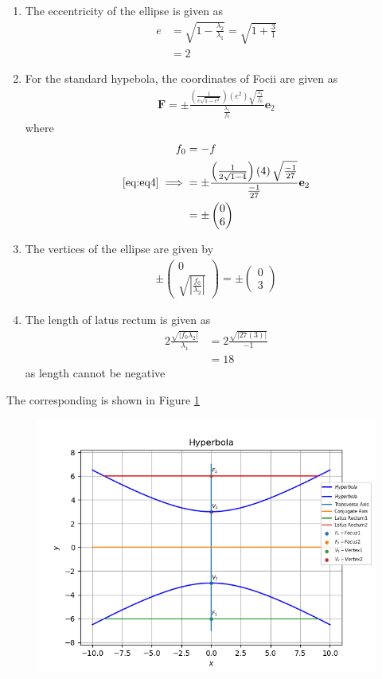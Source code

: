 \documentclass[12pt]{article}
\providecommand{\brak}[1]{\ensuremath{\left(#1\right)}}
\providecommand{\abs}[1]{\left\vert#1\right\vert}
\newcommand{\myvec}[1]{\ensuremath{\begin{pmatrix}#1\end{pmatrix}}}
\let\vec\mathbf
\begin{document}
\begin{enumerate}
\item The eccentricity of the ellipse is given as
\begin{align}
	e &= \sqrt{1 - \frac{\lambda_2}{\lambda_1}} = \sqrt{1+\frac{3}{1}}\\
	  &= 2
\end{align}
\item For the standard hypebola, the coordinates of Focii are given as
\begin{align}
	\label{eq:eq4}
	\vec{F} = \pm \frac{\brak{\frac{1}{e\sqrt{1-e^2}}}\brak{e^2}\sqrt{\frac{\lambda_1}{f_0}}}{\frac{\lambda_1}{f_0}} \vec{e}_2
\end{align}
where
\begin{align}
	f_0 &= -f\\
	\eqref{eq:eq4} \implies &= \pm \frac{\brak{\frac{1}{2\sqrt{1-4}}}\brak{4}\sqrt{\frac{-1}{27}}}{\frac{-1}{27}} \vec{e}_2\\
	&= \pm \myvec{0\\6}
\end{align}
\item The vertices of the ellipse are given by
\begin{align}
	\pm \myvec{0\\\sqrt{\abs{\frac{f_0}{\lambda_2}}}}= \pm \myvec{0\\3}
\end{align}
\item The length of latus rectum is given as
\begin{align}
	2\frac{\sqrt{\abs{f_0 \lambda_2}}}{\lambda_1} &= 2\frac{\sqrt{\abs{27\brak{3}}}}{-1}\\
	&= 18
\end{align}
as length cannot be negative
\end{enumerate}
The corresponding is shown in Figure \ref{fig:Fig1}
\begin{figure}[!h]
	\begin{center} 
	    \includegraphics[width=\columnwidth]{figs/hyperbola}
	\end{center}
\caption{}
\label{fig:Fig1}
\end{figure}
\end{document}
